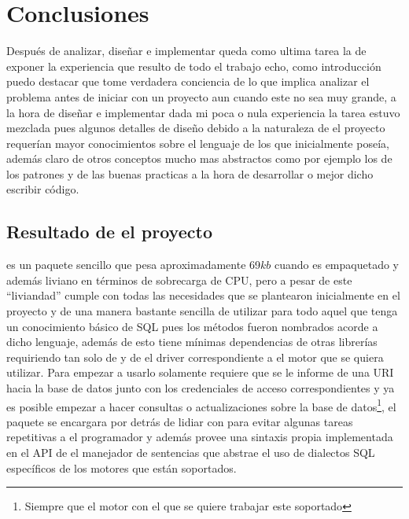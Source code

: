 \chapter*{Conclusiones}
%
%
Después de analizar, diseñar e implementar queda como ultima tarea la de exponer la experiencia que resulto de todo el trabajo echo, como introducción puedo destacar que tome verdadera conciencia de lo que implica analizar el problema antes de iniciar con un proyecto aun cuando este no sea muy grande, a la hora de diseñar e implementar dada mi poca o nula experiencia la tarea estuvo mezclada pues algunos detalles de diseño debido a la naturaleza de el proyecto requerían mayor conocimientos sobre el lenguaje de los que inicialmente poseía, además claro de otros conceptos mucho mas abstractos como por ejemplo los de los patrones y de las buenas practicas a la hora de desarrollar o mejor dicho escribir código.
%
%
\section{Resultado de el proyecto}
%
\jj es un paquete sencillo que pesa aproximadamente 69$kb$ cuando es empaquetado y además liviano en términos de sobrecarga de CPU, pero a pesar de este ``liviandad'' cumple con todas las necesidades que se plantearon inicialmente en el proyecto y de una manera bastante sencilla de utilizar para todo aquel que tenga un conocimiento básico de SQL pues los métodos fueron nombrados acorde a dicho lenguaje, además de esto tiene mínimas dependencias de otras librerías requiriendo tan solo de \jd y de el driver correspondiente a el motor que se quiera utilizar. Para empezar a usarlo solamente requiere que se le informe de una URI hacia la base de datos junto con los credenciales de acceso correspondientes y ya es posible empezar a hacer consultas o actualizaciones sobre la base de datos\footnote{Siempre que el motor con el que se quiere trabajar este soportado}, el paquete se encargara por detrás de lidiar con \jd para evitar algunas tareas repetitivas a el programador y además provee una sintaxis propia implementada en el API de el manejador de sentencias que abstrae el uso de dialectos SQL específicos de los motores que están soportados.

